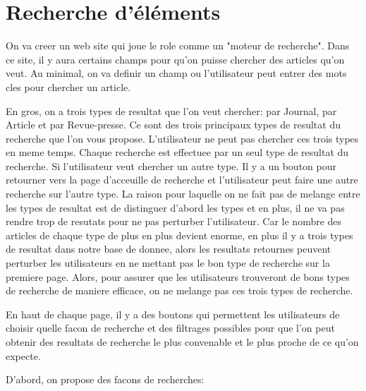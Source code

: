 \section{Recherche d'éléments}
\label{sec:recherche}

On va creer un web site qui joue le role comme un "moteur de recherche". Dans ce site, il y aura certains champs pour qu'on puisse chercher des articles qu'on veut. Au minimal, on va definir un champ ou l'utilisateur peut entrer des mots cles pour chercher un article. 

En gros, on a trois types de resultat que l’on veut chercher: par Journal, par Article et par Revue-presse. Ce sont des trois principaux types de resultat du recherche que l’on vous propose. L’utilisateur ne peut pas chercher ces trois types en meme temps. Chaque recherche est effectuee  par un seul type de resultat du recherche. Si l’utilisateur veut chercher un autre type. Il y a un bouton pour retourner vers la page d’acceuille de recherche et l’utilisateur peut faire une autre recherche sur l’autre type. La raison pour laquelle on ne fait pas de melange entre les types de resultat est de distinguer d’abord les types et en plus, il ne va pas rendre trop de resutats pour ne pas perturber l’utilisateur. Car le nombre des articles de chaque type de plus en plus devient enorme, en plus il y a trois types de resultat dans notre base de donnee, alors les resultats retournes peuvent perturber les utilisateurs en ne mettant pas le bon type de recherche sur la premiere page. Alors, pour assurer que les utilisateurs trouveront de bons types de recherche de maniere efficace, on ne melange pas ces trois types de recherche.

En haut de chaque page, il y a des boutons qui permettent les utilisateurs de choisir quelle facon de recherche et des filtrages possibles pour que l’on peut obtenir des resultats de recherche le plus convenable et le plus proche de ce qu’on expecte.

D’abord, on propose des facons de recherches: 

